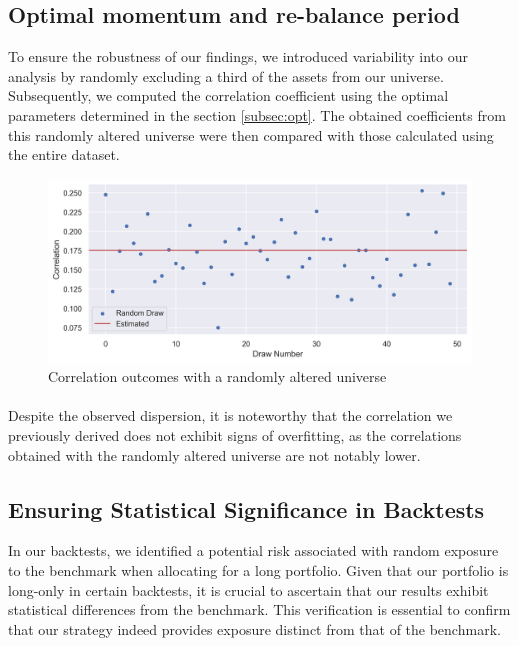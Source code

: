 \documentclass{article}
\begin{document}
\subsection{Optimal momentum and re-balance period}
To ensure the robustness of our findings, we introduced variability into our analysis by randomly excluding a third of the assets from our universe. Subsequently, we computed the correlation coefficient using the optimal parameters determined in the section \ref{subsec:opt}. The obtained coefficients from this randomly altered universe were then compared with those calculated using the entire dataset.

\begin{figure}[H] %
    \centering
    \includegraphics[width=1\linewidth]{robustness.png}
    \caption{Correlation outcomes with a randomly altered universe}
    \label{fig:fig3}
\end{figure}

\paragraph{}
Despite the observed dispersion, it is noteworthy that the correlation we previously derived does not exhibit signs of overfitting, as the correlations obtained with the randomly altered universe are not notably lower.

\subsection{Ensuring Statistical Significance in Backtests}
In our backtests, we identified a potential risk associated with random exposure to the benchmark when allocating for a long portfolio. Given that our portfolio is long-only in certain backtests, it is crucial to ascertain that our results exhibit statistical differences from the benchmark. This verification is essential to confirm that our strategy indeed provides exposure distinct from that of the benchmark.
\end{document}

